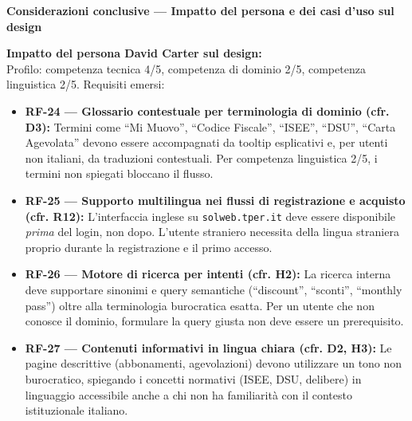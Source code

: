 ﻿\documentclass[11pt,a4paper]{article}
\begin{document}
\vspace{0.3cm}


\begin{tcolorbox}[sectionbox,colback=primaryColor!10]
    \textbf{Considerazioni conclusive --- Impatto del persona e dei casi d'uso sul design}
\end{tcolorbox}
\vspace{0.3cm}

\begin{tcolorbox}[base]
    {\small
    \textbf{Impatto del persona David Carter sul design:} \\[4pt]
    Profilo: competenza tecnica 4/5, competenza di dominio 2/5, competenza linguistica 2/5. Requisiti emersi:

    \begin{itemize}[leftmargin=*]
        \item \textbf{RF-24 --- Glossario contestuale per terminologia di dominio (cfr. D3):} Termini come ``Mi Muovo'', ``Codice Fiscale'', ``ISEE'', ``DSU'', ``Carta Agevolata'' devono essere accompagnati da tooltip esplicativi e, per utenti non italiani, da traduzioni contestuali. Per competenza linguistica 2/5, i termini non spiegati bloccano il flusso.

        \item \textbf{RF-25 --- Supporto multilingua nei flussi di registrazione e acquisto (cfr. R12):} L'interfaccia inglese su \texttt{solweb.tper.it} deve essere disponibile \textit{prima} del login, non dopo. L'utente straniero necessita della lingua straniera proprio durante la registrazione e il primo accesso.

        \item \textbf{RF-26 --- Motore di ricerca per intenti (cfr. H2):} La ricerca interna deve supportare sinonimi e query semantiche (``discount'', ``sconti'', ``monthly pass'') oltre alla terminologia burocratica esatta. Per un utente che non conosce il dominio, formulare la query giusta non deve essere un prerequisito.

        \item \textbf{RF-27 --- Contenuti informativi in lingua chiara (cfr. D2, H3):} Le pagine descrittive (abbonamenti, agevolazioni) devono utilizzare un tono non burocratico, spiegando i concetti normativi (ISEE, DSU, delibere) in linguaggio accessibile anche a chi non ha familiarità con il contesto istituzionale italiano.
    \end{itemize}
    }
\end{tcolorbox}
\end{document}
